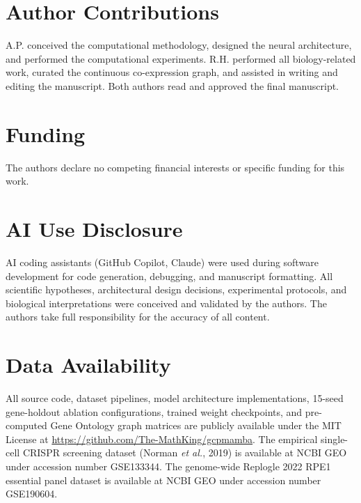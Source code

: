\documentclass{bioinfo}
\begin{document}
\section*{Author Contributions}
A.P. conceived the computational methodology, designed the neural architecture, and performed the computational experiments. R.H. performed all biology-related work, curated the continuous co-expression graph, and assisted in writing and editing the manuscript. Both authors read and approved the final manuscript.

\section*{Funding}
The authors declare no competing financial interests or specific funding for this work.

\section*{AI Use Disclosure}
AI coding assistants (GitHub Copilot, Claude) were used during software development for code generation, debugging, and manuscript formatting. All scientific hypotheses, architectural design decisions, experimental protocols, and biological interpretations were conceived and validated by the authors. The authors take full responsibility for the accuracy of all content.

\section*{Data Availability}
All source code, dataset pipelines, model architecture implementations, 15-seed gene-holdout ablation configurations, trained weight checkpoints, and pre-computed Gene Ontology graph matrices are publicly available under the MIT License at \href{https://github.com/The-MathKing/gcpmamba}{https://github.com/The-MathKing/gcpmamba}. The empirical single-cell CRISPR screening dataset (Norman \textit{et al.}, 2019) is available at NCBI GEO under accession number GSE133344. The genome-wide Replogle 2022 RPE1 essential panel dataset is available at NCBI GEO under accession number GSE190604.
\end{document}

